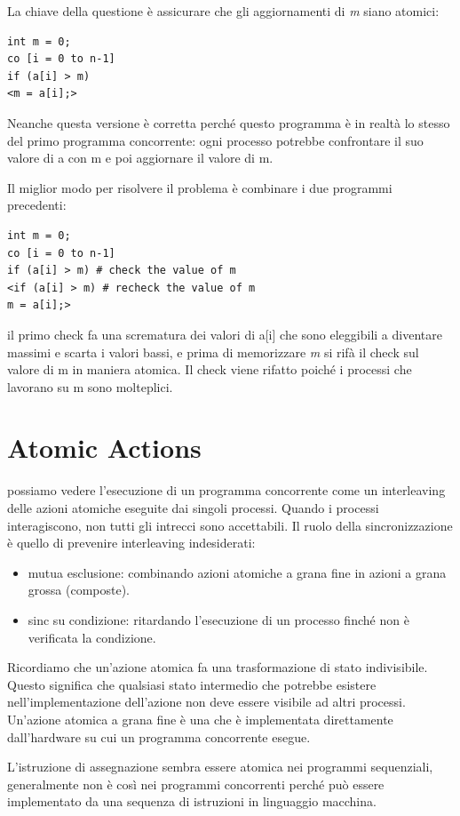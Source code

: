 \documentclass[10pt,a4paper]{book}
\begin{document}
La chiave della questione è assicurare che gli aggiornamenti di \textit{m} siano atomici:
\begin{verbatim}
int m = 0;
co [i = 0 to n-1]
if (a[i] > m)
<m = a[i];>
\end{verbatim} 
Neanche questa versione è corretta perché questo programma è in realtà lo stesso del primo programma concorrente: ogni processo potrebbe confrontare il suo valore di a con m e poi aggiornare il valore di m.

Il miglior modo per risolvere il problema è combinare i due programmi precedenti:
\begin{verbatim}
int m = 0;
co [i = 0 to n-1]
if (a[i] > m) # check the value of m
<if (a[i] > m) # recheck the value of m
m = a[i];>
\end{verbatim}

il primo check fa una scrematura dei valori di a[i] che sono eleggibili a diventare massimi e scarta i valori bassi, e prima di memorizzare \textit{m} si rifà il check sul valore di m in maniera atomica. Il check viene rifatto poiché i processi che lavorano su m sono molteplici.

\section{Atomic Actions}
possiamo vedere l'esecuzione di un programma concorrente come un interleaving delle azioni atomiche eseguite dai singoli processi. Quando i processi interagiscono, non tutti gli intrecci sono accettabili. Il ruolo della sincronizzazione è quello di prevenire interleaving indesiderati: 
\begin{itemize}
\item mutua esclusione: combinando azioni atomiche a grana fine in azioni a grana grossa (composte).
\item sinc su condizione: ritardando l'esecuzione di un processo finché non è verificata la condizione.
\end{itemize}

Ricordiamo che un'azione atomica fa una trasformazione di stato indivisibile. Questo
significa che qualsiasi stato intermedio che potrebbe esistere nell'implementazione dell'azione
non deve essere visibile ad altri processi. Un'azione atomica a grana fine è una
che è implementata direttamente dall'hardware su cui un programma concorrente
esegue.

L'istruzione di assegnazione sembra essere atomica nei programmi sequenziali, generalmente non è così nei programmi concorrenti perché può essere implementato da una sequenza di istruzioni in linguaggio macchina.
\end{document}
